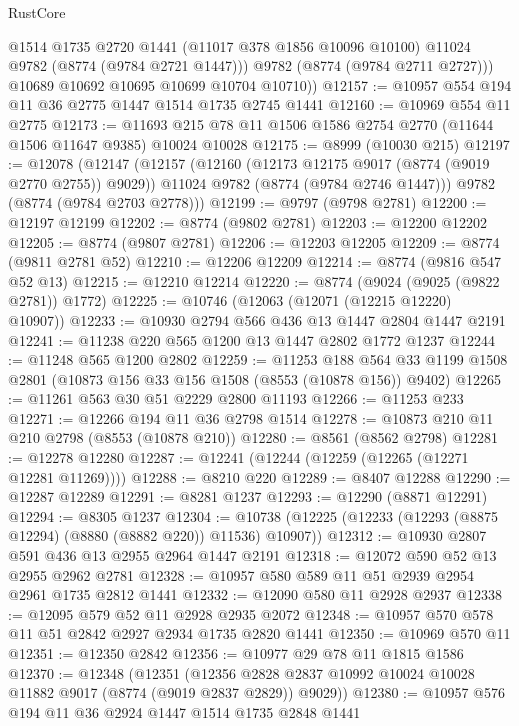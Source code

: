 \begin{lexlean}{RustCore}
\begin{coremodule}
            @1514
            @1735
            @2720
            @1441
            (@11017 @378 @1856 @10096 @10100)
            @11024
            @9782
            (@8774 (@9784 @2721 @1447)))
          @9782
          (@8774 (@9784 @2711 @2727)))
        @10689
        @10692
        @10695
        @10699
        @10704
        @10710))
@12157 := @10957 @554 @194 @11 @36 @2775 @1447 @1514 @1735 @2745 @1441
@12160 := @10969 @554 @11 @2775
@12173 := @11693 @215 @78 @11 @1506 @1586 @2754 @2770 (@11644 @1506 @11647 @9385) @10024 @10028
@12175 := @8999 (@10030 @215)
@12197 := @12078
    (@12147
      (@12157
        (@12160 (@12173 @12175 @9017 (@8774 (@9019 @2770 @2755)) @9029))
        @11024
        @9782
        (@8774 (@9784 @2746 @1447)))
      @9782
      (@8774 (@9784 @2703 @2778)))
@12199 := @9797 (@9798 @2781)
@12200 := @12197 @12199
@12202 := @8774 (@9802 @2781)
@12203 := @12200 @12202
@12205 := @8774 (@9807 @2781)
@12206 := @12203 @12205
@12209 := @8774 (@9811 @2781 @52)
@12210 := @12206 @12209
@12214 := @8774 (@9816 @547 @52 @13)
@12215 := @12210 @12214
@12220 := @8774 (@9024 (@9025 (@9822 @2781)) @1772)
@12225 := @10746 (@12063 (@12071 (@12215 @12220) @10907))
@12233 := @10930 @2794 @566 @436 @13 @1447 @2804 @1447 @2191
@12241 := @11238 @220 @565 @1200 @13 @1447 @2802 @1772 @1237
@12244 := @11248 @565 @1200 @2802
@12259 := @11253
    @188
    @564
    @33
    @1199
    @1508
    @2801
    (@10873 @156 @33 @156 @1508 (@8553 (@10878 @156)) @9402)
@12265 := @11261 @563 @30 @51 @2229 @2800 @11193
@12266 := @11253 @233
@12271 := @12266 @194 @11 @36 @2798 @1514
@12278 := @10873 @210 @11 @210 @2798 (@8553 (@10878 @210))
@12280 := @8561 (@8562 @2798)
@12281 := @12278 @12280
@12287 := @12241 (@12244 (@12259 (@12265 (@12271 @12281 @11269))))
@12288 := @8210 @220
@12289 := @8407 @12288
@12290 := @12287 @12289
@12291 := @8281 @1237
@12293 := @12290 (@8871 @12291)
@12294 := @8305 @1237
@12304 := @10738 (@12225 (@12233 (@12293 (@8875 @12294) (@8880 (@8882 @220)) @11536) @10907))
@12312 := @10930 @2807 @591 @436 @13 @2955 @2964 @1447 @2191
@12318 := @12072 @590 @52 @13 @2955 @2962 @2781
@12328 := @10957 @580 @589 @11 @51 @2939 @2954 @2961 @1735 @2812 @1441
@12332 := @12090 @580 @11 @2928 @2937
@12338 := @12095 @579 @52 @11 @2928 @2935 @2072
@12348 := @10957 @570 @578 @11 @51 @2842 @2927 @2934 @1735 @2820 @1441
@12350 := @10969 @570 @11
@12351 := @12350 @2842
@12356 := @10977 @29 @78 @11 @1815 @1586
@12370 := @12348
    (@12351
      (@12356 @2828 @2837 @10992 @10024 @10028 @11882 @9017 (@8774 (@9019 @2837 @2829)) @9029))
@12380 := @10957 @576 @194 @11 @36 @2924 @1447 @1514 @1735 @2848 @1441

\end{coremodule}
\end{lexlean}
